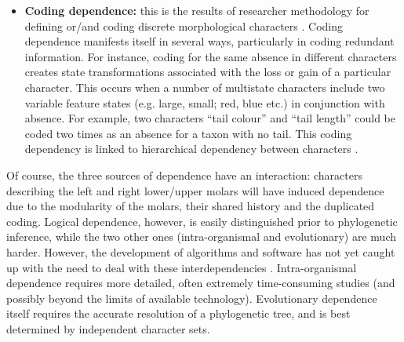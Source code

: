 \documentclass[12pt,letterpaper]{article}
\begin{document}
\begin{itemize}
    \item \textbf{Coding dependence:} this is the results of researcher methodology for defining or/and coding discrete morphological characters \citep{Brazeau2011,simoes2017giant}.
    Coding dependence manifests itself in several ways, particularly in coding redundant information.
    For instance, coding for the same absence in different characters creates state transformations associated with the loss or gain of a particular character.
    This occurs when a number of multistate characters include two variable feature states (e.g. large, small; red, blue etc.) in conjunction with absence.
    For example, two characters ``tail colour'' and ``tail length'' could be coded two times as an absence for a taxon with no tail.
    This coding dependency is linked to hierarchical dependency between characters \citep{wilkinson1995coping,BrazeauNA}.
\end{itemize}

\noindent Of course, the three sources of dependence have an interaction: characters describing the left and right lower/upper molars will have induced dependence due to the modularity of the molars, their shared history and the duplicated coding.
Logical dependence, however, is easily distinguished prior to phylogenetic inference, while the two other ones (intra-organismal and evolutionary) are much harder.
However, the development of algorithms and software has not yet caught up with the need to deal with these interdependencies \citep{de2015parsimony,BrazeauNA}.
Intra-organismal dependence requires more detailed, often extremely time-consuming studies (and possibly beyond the limits of available technology).
Evolutionary dependence itself requires the accurate resolution of a phylogenetic tree, and is best determined by independent character sets. 
\end{document}
